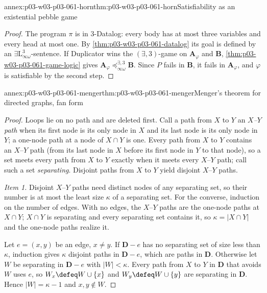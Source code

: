 \begin{annexitem}{annex:p03-w03-p03-061-horn}{thm:p03-w03-p03-061-horn}{Satisfiability as an existential pebble game}
\begin{proof}
The program \(\pi\) is in \(3\)-Datalog: every body has at most three
variables and every head at most one. By
\cref{thm:p03-w03-p03-061-datalog} its goal is defined by an
\(\exists\mathrm L^3_{\infty\omega}\)-sentence. If Duplicator wins the
\((\exists,3)\)-game on \(\mathbf A_\varphi\) and \(\mathbf B\),
\cref{thm:p03-w03-p03-061-game-logic} gives
\(\mathbf A_\varphi\preceq^{\exists,3}_{\infty\omega}\mathbf B\). Since \(P\)
fails in \(\mathbf B\), it fails in \(\mathbf A_\varphi\), and \(\varphi\) is
satisfiable by the second step.
\end{proof}
\end{annexitem}

\begin{annexitem}{annex:p03-w03-p03-061-menger}{thm:p03-w03-p03-061-menger}{Menger's theorem for directed graphs, fan form}
\begin{proof}
Loops lie on no path and are deleted first. Call a path from \(X\) to \(Y\)
an \emph{\(X\)--\(Y\) path} when its first node is its only node in \(X\) and
its last node is its only node in \(Y\); a one-node path at a node of
\(X\cap Y\) is one. Every path from \(X\) to \(Y\) contains an
\(X\)--\(Y\) path (from its last node in \(X\) before its first node in
\(Y\) to that node), so a set meets every path from \(X\) to \(Y\) exactly
when it meets every \(X\)--\(Y\) path; call such a set
\emph{separating}. Disjoint paths from \(X\) to \(Y\) yield disjoint
\(X\)--\(Y\) paths.

\emph{Item 1.} Disjoint \(X\)--\(Y\) paths need distinct nodes of any
separating set, so their number is at most the least size \(\kappa\) of a
separating set. For the converse, induction on the number of edges. With no
edges, the \(X\)--\(Y\) paths are the one-node paths at \(X\cap Y\);
\(X\cap Y\) is separating and every separating set contains it, so
\(\kappa=|X\cap Y|\) and the one-node paths realize it.

Let \(e=(x,y)\) be an edge, \(x\neq y\). If \(\mathbf D-e\) has no separating
set of size less than \(\kappa\), induction gives \(\kappa\) disjoint paths in
\(\mathbf D-e\), which are paths in \(\mathbf D\). Otherwise let \(W\) be
separating in \(\mathbf D-e\) with \(|W|<\kappa\). Every path from \(X\) to
\(Y\) in \(\mathbf D\) that avoids \(W\) uses \(e\), so \(W_x\defeq
W\cup\{x\}\) and \(W_y\defeq W\cup\{y\}\) are separating in \(\mathbf D\).
Hence \(|W|=\kappa-1\) and \(x,y\notin W\).


\end{proof}
\end{annexitem}
